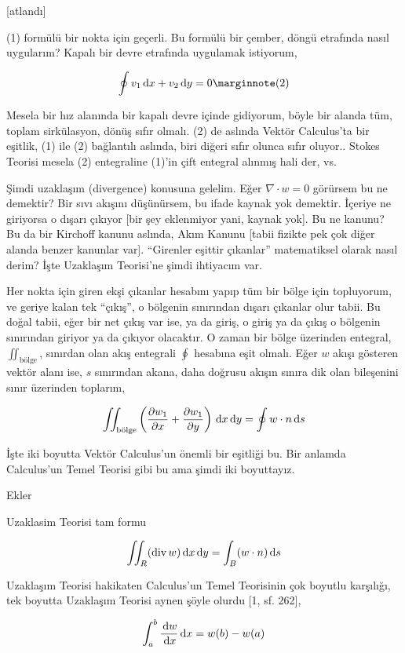 \documentclass[12pt,fleqn]{article}\usepackage{../../common}
\begin{document}
[atlandı]

(1) formülü bir nokta için geçerli. Bu formülü bir çember, döngü etrafında
nasıl uygularım? Kapalı bir devre etrafında uygulamak istiyorum,

$$
\oint v_1 \ud x + v_2 \ud y = 0
\mlabel{2}
$$
 
Mesela bir hız alanında bir kapalı devre içinde gidiyorum, böyle bir alanda tüm,
toplam sirkülasyon, dönüş sıfır olmalı. (2) de aslında Vektör Calculus'ta bir
eşitlik, (1) ile (2) bağlantılı aslında, biri diğeri sıfır olunca sıfır oluyor..
Stokes Teorisi mesela (2) entegraline (1)'in çift entegral alınmış hali der, vs.

Şimdi uzaklaşım (divergence) konusuna gelelim. Eğer $\nabla \cdot w = 0$
görürsem bu ne demektir? Bir sıvı akışını düşünürsem, bu ifade kaynak yok
demektir. İçeriye ne giriyorsa o dışarı çıkıyor [bir şey eklenmiyor yani, kaynak
yok]. Bu ne kanunu? Bu da bir Kirchoff kanunu aslında, Akım Kanunu [tabii
fizikte pek çok diğer alanda benzer kanunlar var]. ``Girenler eşittir çıkanlar''
matematiksel olarak nasıl derim? İşte Uzaklaşım Teorisi'ne şimdi ihtiyacım var.

Her nokta için giren ekşi çıkanlar hesabını yapıp tüm bir bölge için topluyorum,
ve geriye kalan tek ``çıkış'', o bölgenin sınırından dışarı çıkanlar olur tabii.
Bu doğal tabii, eğer bir net çıkış var ise, ya da giriş, o giriş ya da çıkış o
bölgenin sınırından giriyor ya da çıkıyor olacaktır. O zaman bir bölge üzerinden
entegral, $\iint_{\textrm{bölge}}$, sınırdan olan akış entegrali $\oint$
hesabına eşit olmalı. Eğer $w$ akışı gösteren vektör alanı ise, $s$ sınırından
akana, daha doğrusu akışın sınıra dik olan bileşenini sınır üzerinden toplarım,

$$
\iint_{\textrm{bölge}} \left( 
\frac{\partial w_1}{\partial x} +
\frac{\partial w_1}{\partial y}   \right)
\,\mathrm{d} x \,\mathrm{d} y =
\oint w \cdot n \,\mathrm{d} s
$$

İşte iki boyutta Vektör Calculus'un önemli bir eşitliği bu. Bir anlamda
Calculus'un Temel Teorisi gibi bu ama şimdi iki boyuttayız.

Ekler

Uzaklasim Teorisi tam formu

$$
\iint_R (\operatorname{div} w) \,\mathrm{d} x \,\mathrm{d} y = \int_B  ( w \cdot n ) \,\mathrm{d} s
$$

Uzaklaşım Teorisi hakikaten Calculus'un Temel Teorisinin çok boyutlu karşılığı,
tek boyutta Uzaklaşım Teorisi aynen şöyle olurdu [1, sf. 262],

$$
\int _{a}^{b} \frac{\,\mathrm{d} w}{\,\mathrm{d} x} \,\mathrm{d} x = w(b) - w(a)
$$
\end{document}
